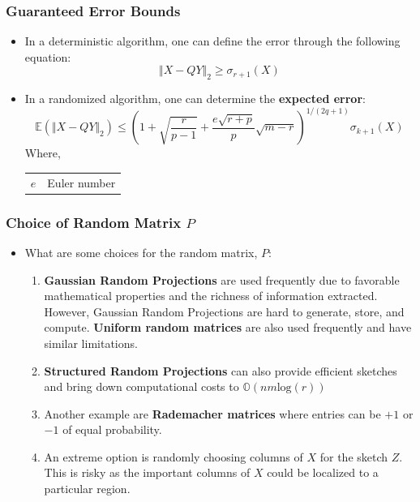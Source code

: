 \documentclass[11.5pt,a4paper]{article}
\makeatletter
\newenvironment{conditions}
  {\par\vspace{\abovedisplayskip}\noindent\begin{tabular}{>{$}l<{$} @{${}={}$} l}}
  {\end{tabular}\par\vspace{\belowdisplayskip}}
\makeatother
\begin{document}
\subsubsection*{Guaranteed Error Bounds}

\begin{itemize}
    \item In a deterministic algorithm, one can define the error through the following equation:
    \begin{equation*}
        \Vert X - QY \Vert_2 \geq \sigma_{r+1}(X)
    \end{equation*}
    \item In a randomized algorithm, one can determine the \textbf{expected error}:
    \begin{equation*}
        \mathbb{E}(\Vert X - QY \Vert_2) \leq \left( 1 + \sqrt{\frac{r}{p-1}} + \frac{e\sqrt{r+p}}{p}\sqrt{m-r} \right)^{1/(2q+1)}\sigma_{k+1}(X)
    \end{equation*}
    Where,
    \begin{conditions}
        e & Euler number
    \end{conditions}
\end{itemize}

\subsubsection*{Choice of Random Matrix $P$}

\begin{itemize}
    \item What are some choices for the random matrix, $P$:
    \begin{enumerate}
        \item \textbf{Gaussian Random Projections} are used frequently due to favorable mathematical properties and the richness of information extracted. However, Gaussian Random Projections are hard to generate, store, and compute. \textbf{Uniform random matrices} are also used frequently and have similar limitations.
        \item \textbf{Structured Random Projections} can also provide efficient sketches and bring down computational costs to $\mathbb{O}(nm\text{log}(r))$
        \item Another example are \textbf{Rademacher matrices} where entries can be $+1$ or $-1$ of equal probability.
        \item An extreme option is randomly choosing columns of $X$ for the sketch $Z$. This is risky as the important columns of $X$ could be localized to a particular region.
    \end{enumerate}
\end{itemize}
\end{document}
